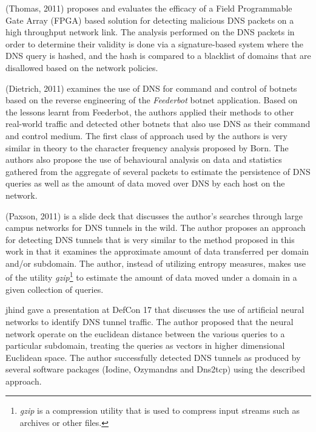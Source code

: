 \documentclass{llncs}
\begin{document}
(Thomas, 2011)\cite{Thomas2011} proposes and evaluates the efficacy of a Field
Programmable Gate Array (FPGA) based solution for detecting malicious DNS
packets on a high throughput network link. The analysis performed on the DNS
packets in order to determine their validity is done via a signature-based
system where the DNS query is hashed, and the hash is compared to a blacklist of
domains that are disallowed based on the network policies.

(Dietrich, 2011)\cite{Dietrich2011} examines the use of DNS for command and
control of botnets based on the reverse engineering of the \emph{Feederbot}
botnet application. Based on the lessons learnt from Feederbot, the authors
applied their methods to other real-world traffic and detected other botnets
that also use DNS as their command and control medium. The first class of approach used by the authors is very similar in theory to the character frequency analysis proposed
by Born\cite{Born2010.cfa}. The authors also
propose the use of behavioural analysis on data and statistics gathered from the
aggregate of several packets to estimate the persistence of DNS queries as well
as the amount of data moved over DNS by each host on the network.

(Paxson, 2011)\cite{Paxson2011} is a slide deck that discusses the author's
searches through large campus networks for DNS tunnels in the wild. The author
proposes an approach for detecting DNS tunnels that is very similar to the
method proposed in this work in that it examines the approximate amount of data
transferred per domain and/or subdomain. The author, instead of utilizing
entropy measures, makes use of the utility \emph{gzip}\footnote{\emph{gzip} is a
compression utility that is used to compress input streams such as archives or
other files.} to estimate the amount of data moved under a domain in a given
collection of queries.

jhind\cite{jhind2009} gave a presentation at DefCon 17 that discusses the use of
artificial neural networks to identify DNS tunnel traffic. The author proposed
that the neural network operate on the euclidean distance between the various
queries to a particular subdomain, treating the queries as vectors in higher
dimensional Euclidean space. The author successfully detected DNS tunnels as
produced by several software packages (Iodine, Ozymandns and Dns2tcp) using the
described approach.
\end{document}
